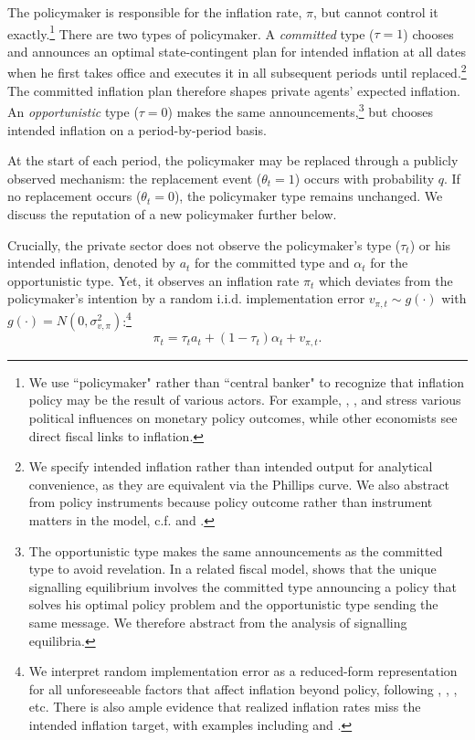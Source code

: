 \documentclass[12pt,letter,leqno]{article}
\theoremstyle{asn}
\theoremstyle{lem}
\theoremstyle{slem}
\theoremstyle{prop}
\theoremstyle{appprop}
\theoremstyle{rem}
\theoremstyle{defn}
\begin{document}
The policymaker is responsible for the inflation rate, $\pi $, but cannot control it exactly.\footnote{%
We use ``policymaker" rather than ``central banker" to
recognize that inflation policy may be the result of various actors. For
example, \cite{de_long_americas_1996},  \cite{levin_falling_2010}, and \cite{meltzer_history_2014} stress various political influences on monetary
policy outcomes, while other economists see direct fiscal links to inflation.} There are two types of policymaker. A \textit{committed} type ($\tau=1$) chooses and announces an optimal state-contingent 
plan for intended inflation at all dates when he first takes office and executes it in all subsequent
periods until replaced.\footnote{%
We specify intended inflation rather than intended output for analytical convenience, as they are equivalent via the Phillips curve. We also abstract from policy instruments because policy outcome rather than instrument matters in the model, c.f. \cite{faust_transparency_2001} and \cite{sargent_conquest_1999}.} The committed inflation plan therefore shapes private agents' expected inflation. An \textit{opportunistic} type ($\tau=0$) makes the same announcements,\footnote{The opportunistic type makes the same announcements as the committed type to avoid revelation. In a related fiscal model,  \cite{lu_optimal_2013} shows that the unique signalling equilibrium involves the committed type announcing a policy
that solves his optimal policy problem and the opportunistic type sending the same
message. We therefore abstract from the analysis of signalling equilibria.} but chooses intended inflation on a period-by-period basis. 

At the start of each period, the policymaker may be replaced through a publicly observed mechanism: the replacement event ($\theta_t=1$) occurs with probability $q$. If no replacement occurs ($\theta_t=0$), the policymaker type remains unchanged. We discuss the reputation of a new policymaker further below. 

Crucially, the private sector does not observe the policymaker's type ($\tau_t$) or his intended
inflation, denoted by $a_{t}$ for the committed type and $\alpha_{t}$ for the opportunistic type. Yet, it observes an inflation rate $\pi_t$ which 
deviates from the policymaker's intention by a random i.i.d. implementation error $v_{\pi,t} \sim g(\cdot)$ with $g(\cdot) = N(0,\sigma_{v,\pi}^2)$:\footnote{We interpret random implementation error as a
reduced-form representation for all unforeseeable factors that affect
inflation beyond policy, following \cite{cukierman_theory_1986}, \cite{faust_transparency_2001}, \cite{atkeson_advantage_2006}, etc. There is also
ample evidence that realized inflation rates miss the intended inflation
target, with examples including \cite{roger_target_2005} and \cite{mishkin_does_2007}.} 
\begin{equation}\label{eq:pi}
    \pi_t=\tau_t a_t + (1-\tau_t) \alpha_t + v_{\pi,t}.
\end{equation}
\end{document}

